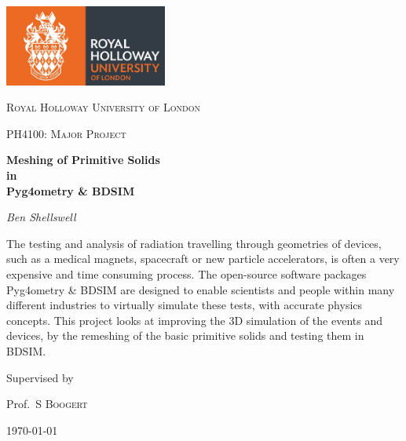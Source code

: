 \documentclass[12pt,a4paper]{article}
\begin{document}
\begin{titlepage}
	\centering
	\includegraphics[width=0.4\textwidth]{Images//Logos//rhul.jpg}\par\vspace{1cm}


	{\scshape\LARGE Royal Holloway University of London \par}
	\vspace{1cm}
	{\scshape\Large PH4100: Major Project\par}
	\vspace{1.5cm}
	{\huge\bfseries Meshing of Primitive Solids\\
	in\\
	Pyg4ometry \& BDSIM\par}
	\vspace{2cm}
	{\Large\itshape Ben Shellswell\par}
	\vfill

\begin{abstract}
\centering

\end{abstract}
The testing and analysis of radiation travelling through geometries of devices, such as a medical magnets, spacecraft or new particle accelerators, is often a very expensive and time consuming process. The open-source software packages Pyg4ometry \& BDSIM are designed to enable scientists and people within many different industries to virtually simulate these tests, with accurate physics concepts. This project looks at improving the 3D simulation of the events and devices, by the remeshing of the basic primitive solids and testing them in BDSIM.

	\vfill
	
	Supervised by\par
	Prof.~S \textsc{Boogert} 

	{\large \today\par}




\end{titlepage}
\end{document}
